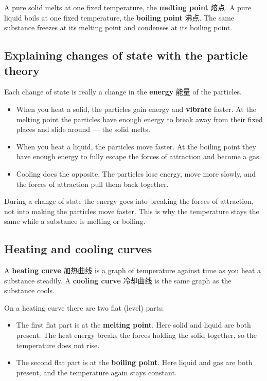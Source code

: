 \documentclass[11pt]{article}
\begin{document}
A pure solid melts at one fixed temperature, the \textbf{melting point} 熔点. A pure liquid boils at one fixed temperature, the \textbf{boiling point} 沸点. The same substance freezes at its melting point and condenses at its boiling point.

\subsection*{Explaining changes of state with the particle theory}

Each change of state is really a change in the \textbf{energy} 能量 of the particles.

\begin{itemize}
\item When you heat a solid, the particles gain energy and \textbf{vibrate} faster. At the melting point the particles have enough energy to break away from their fixed places and slide around — the solid melts.

\item When you heat a liquid, the particles move faster. At the boiling point they have enough energy to fully escape the forces of attraction and become a gas.

\item Cooling does the opposite. The particles lose energy, move more slowly, and the forces of attraction pull them back together.

\end{itemize}

During a change of state the energy goes into breaking the forces of attraction, not into making the particles move faster. This is why the temperature stays the same while a substance is melting or boiling.

\subsection*{Heating and cooling curves}

A \textbf{heating curve} 加热曲线 is a graph of temperature against time as you heat a substance steadily. A \textbf{cooling curve} 冷却曲线 is the same graph as the substance cools.

On a heating curve there are two flat (level) parts:

\begin{itemize}
\item The first flat part is at the \textbf{melting point}. Here solid and liquid are both present. The heat energy breaks the forces holding the solid together, so the temperature does not rise.

\item The second flat part is at the \textbf{boiling point}. Here liquid and gas are both present, and the temperature again stays constant.

\end{itemize}
\end{document}
